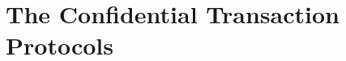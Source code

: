 \section{The Confidential Transaction Protocols}\label{sec:MainProtocol}


\newcommand{\init}{\mathsf{init}}
\newcommand{\issue}{\mathsf{issue}}
\newcommand{\transfer}{\mathsf{transfer}}
\newcommand{\audit}{\mathsf{audit}}
\newcommand{\rollover}{\mathsf{rollover}}
\newcommand{\withraw}{\mathsf{withraw}}
\newcommand{\history}{\mathsf{history}}
\newcommand{\balance}{\mathsf{avlBlance}}
\newcommand{\pendbalance}{\mathsf{pndBalance}}
\newcommand{\tcount}{\mathsf{tcount}}

\newcommand{\historylog}{\mathsf{log}}
\newcommand{\sConfTran}{\mathsf{ConfTrans}}
\newcommand{\pluseq}{\mathrel{+}=}
\newcommand{\minuseq}{\mathrel{-}=}
\newcommand{\unioneq}{\mathrel{\cup}=}

\newcommand{\fConfTran}{\MathAlgX{\cF_\sConfTran}}
\newcommand{\pConfTran}{\MathAlgX{\Pi_\sConfTran}}

\newcommand{\largest}{{\mathsf{lrg}}}
\newcommand{\posvst}{{\mathsf{pos}}}
\newcommand{\tempst}{{\mathsf{tmp}}}

\newcommand{\Issuer}{{\MathAlgX{Iss}}}
\newcommand{\Chain}{{\MathAlgX{C}}}
\newcommand{\pcount}{p_{\mathsf{pcount}} }
\newcommand{\psize}{p_{\mathsf{size}} }




\newcommand{\rEnc}{{\cR_{\sf Enc}}}
\newcommand{\rEncDef}
{
	\set{((\pk,A),(a,r))\colon \Enc_\pk(a;r)= A}
}

\newcommand{\rKeyGen}{{\cR_{\sf KeyGen}}}

\newcommand{\rKeyGenDef}
{
	\set{(\pk,w))\colon \KeyGen(w)= (\cdot,\pk)}
}




\newcommand{\Eqs}{{\sf Eq}}
\newcommand{\rEq}{\cR_\Eqs}

\newcommand{\rEqDef}
{
	\set{((\pk_0,\pk_1,\oA_0,\oA_1),(a,r_0,r_1))\colon \forall i\in \zo \; \Enc_{\pk_i}(a;r_i)= \A_i}
}


\newcommand{\RPs}{{\sf Rp}}
\newcommand{\rRp}{\cR_\RPs}

\newcommand{\rRpDef}
{
	\set{((\pk,\oA,b),(a,r))\colon \Enc_\pk(a;r)= \oA \sland a\in (b)}
}


\newcommand{\LrgEqs}{{\sf LrgerEq}}
\newcommand{\rLrgEq}{\cR_\LrgEqs}

\newcommand{\rLrgEqDef}
{
	\set{((\pk,\oA_0,\oA_1),(a_0,r_0,a_1,r_1))\colon \forall i\in \zo \; \Enc_\pk(a_i;r_i)= \oA_i \sland a_1 -a_0 \in (q)} 
}



